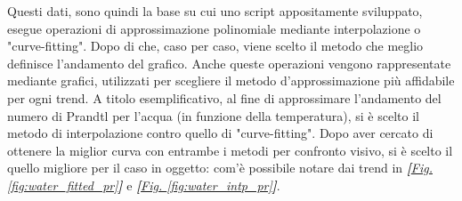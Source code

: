 \documentclass[a4paper,10pt]{article}                                                                                       %
\begin{document}
  Questi dati, sono quindi la base su cui uno script appositamente sviluppato, esegue operazioni di approssimazione
  polinomiale mediante interpolazione o "curve-fitting". Dopo di che, caso per caso, viene scelto il metodo che meglio
  definisce l'andamento del grafico. Anche queste operazioni vengono rappresentate mediante grafici, utilizzati per
  scegliere il metodo d'approssimazione più affidabile per ogni trend. A titolo esemplificativo, al fine di approssimare
  l'andamento del numero di Prandtl per l'acqua (in funzione della temperatura), si è scelto il metodo di interpolazione
  contro quello di "curve-fitting". Dopo aver cercato di ottenere la miglior curva con entrambe i metodi per confronto
  visivo, si è scelto il quello migliore per il caso in oggetto: com'è possibile notare dai trend in
  \textit{\textbf{[}\hyperref[fig:water_fitted_pr]{Fig. }\ref{fig:water_fitted_pr}\textbf{]}} e
  \textit{\textbf{[}\hyperref[fig:water_intp_pr]{Fig. }\ref{fig:water_intp_pr}\textbf{]}}.
\end{document}
